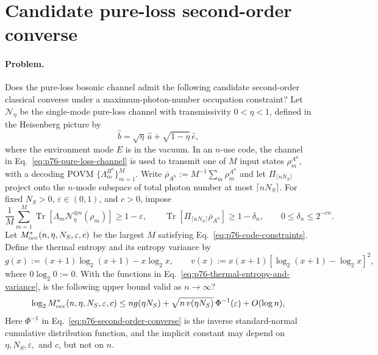 \section{Candidate pure-loss second-order converse}
\label{sec:problem-76}

\paragraph{Problem.}
Does the pure-loss bosonic channel admit the following candidate second-order
classical converse under a maximum-photon-number occupation constraint?  Let
$\mathcal N_\eta$ be the single-mode pure-loss channel with transmissivity
$0<\eta<1$, defined in the Heisenberg picture by
\begin{equation}
  \hat b=\sqrt{\eta}\,\hat a+\sqrt{1-\eta}\,\hat e,
  \label{eq:p76-pure-loss-channel}
\end{equation}
where the environment mode $E$ is in the vacuum.  In an $n$-use code, the
channel in Eq.~\eqref{eq:p76-pure-loss-channel} is used to transmit one of
$M$ input states $\rho_m^{A^n}$, with a decoding POVM
$\{\Lambda_m^{B^n}\}_{m=1}^M$.  Write
$\overline\rho_{A^n}:=M^{-1}\sum_m\rho_m^{A^n}$ and let
$\Pi_{\lceil nN_S\rceil}$ project onto the $n$-mode subspace of total photon
number at most $\lceil nN_S\rceil$.  For fixed $N_S>0$,
$\varepsilon\in(0,1)$, and $c>0$, impose
\begin{equation}
  \frac1M\sum_{m=1}^M
    \operatorname{Tr}\!\left[
      \Lambda_m\mathcal N_\eta^{\otimes n}(\rho_m)
    \right]
    \geq1-\varepsilon,
  \qquad
  \operatorname{Tr}\!\left[
    \Pi_{\lceil nN_S\rceil}\overline\rho_{A^n}
  \right]
    \geq1-\delta_n,
  \qquad
  0\leq\delta_n\leq2^{-cn}.
  \label{eq:p76-code-constraints}
\end{equation}
Let $M^*_{\rm occ}(n,\eta,N_S,\varepsilon,c)$ be the largest $M$ satisfying
Eq.~\eqref{eq:p76-code-constraints}.  Define the thermal entropy and its
entropy variance by
\begin{equation}
  g(x):=(x+1)\log_2(x+1)-x\log_2x,
  \qquad
  v(x):=x(x+1)
    \left[\log_2(x+1)-\log_2x\right]^2,
  \label{eq:p76-thermal-entropy-and-variance}
\end{equation}
where $0\log_2 0:=0$.  With the functions in
Eq.~\eqref{eq:p76-thermal-entropy-and-variance}, is the following upper bound
valid as $n\to\infty$?
\begin{equation}
  \log_2 M^*_{\rm occ}(n,\eta,N_S,\varepsilon,c)
  \leq ng(\eta N_S)
    +\sqrt{n\,v(\eta N_S)}\,\Phi^{-1}(\varepsilon)
    +O(\log n),
  \label{eq:p76-second-order-converse}
\end{equation}
Here $\Phi^{-1}$ in Eq.~\eqref{eq:p76-second-order-converse} is the inverse
standard-normal cumulative distribution function, and the implicit constant
may depend on $\eta,N_S,\varepsilon,$ and $c$, but not on $n$.


